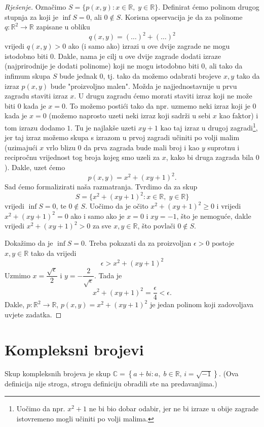 \begin{proof}[Rješenje]
Označimo $S=\{p(x, y) : x\in \mathbb{R},\; y\in \mathbb{R}\}$. Definirat ćemo polinom drugog stupnja za koji je $\inf{S}=0$, ali $0\notin S$. Korisna opservacija je da za polinome $q : \mathbb{R}^2\to \mathbb{R}$ zapisane u obliku
$$q(x, y)=(\dots)^2+(\dots)^2$$
vrijedi $q(x, y)>0$ ako (i samo ako) izrazi u ove dvije zagrade ne mogu istodobno biti $0$. Dakle, nama je cilj u ove dvije zagrade dodati izraze (najprirodnije je dodati polinome) koji ne mogu istodobno biti $0$, ali tako da infimum skupa $S$ bude jednak $0$, tj. tako da možemo odabrati brojeve $x, y$ tako da izraz $p(x, y)$ bude "proizvoljno malen". Možda je najjednostavnije u prvu zagradu staviti izraz $x$. U drugu zagradu ćemo morati staviti izraz koji ne može biti $0$ kada je $x=0$. To možemo postići tako da npr. uzmemo neki izraz koji je $0$ kada je $x=0$ (možemo naprosto uzeti neki izraz koji sadrži u sebi $x$ kao faktor) i tom izrazu dodamo $1$. Tu je najlakše uzeti $xy+1$ kao taj izraz u drugoj zagradi\footnote{Uočimo da npr. $x^2+1$ ne bi bio dobar odabir, jer ne bi izraze u obije zagrade istovremeno mogli učiniti po volji malima.}, jer taj izraz možemo skupa s izrazom u prvoj zagradi učiniti po volji malim (uzimajući $x$ vrlo blizu $0$ da prva zagrada bude mali broj i kao $y$ suprotnu i recipročnu vrijednost tog broja kojeg smo uzeli za $x$, kako bi druga zagrada bila $0$). Dakle, uzet ćemo
$$p(x, y)=x^2+(xy+1)^2.$$
Sad ćemo formalizirati naša razmatranja. Tvrdimo da za skup
$$S=\{x^2+(xy+1)^2 : x\in \mathbb{R},\; y\in \mathbb{R}\}$$
vrijedi $\inf{S}=0$, te $0\notin S$. Uočimo da je očito $x^2+(xy+1)^2\geq 0$ i vrijedi $x^2+(xy+1)^2=0$ ako i samo ako je $x=0$ i $xy=-1$, što je nemoguće, dakle vrijedi $x^2+(xy+1)^2>0$ za sve $x, y\in \mathbb{R}$, što povlači $0\notin S$.

Dokažimo da je $\inf{S}=0$. Treba pokazati da za proizvoljan $\epsilon>0$ postoje $x, y\in \mathbb{R}$ tako da vrijedi
$$\epsilon> x^2+(xy+1)^2$$
Uzmimo $x=\dfrac{\sqrt{\epsilon}}{2}$ i $y=-\dfrac{2}{\sqrt{\epsilon}}$. Tada je
$$x^2+(xy+1)^2=\dfrac{\epsilon}{4}<\epsilon.$$
Dakle, $p : \mathbb{R}^2\to \mathbb{R}$, $p(x, y)=x^2+(xy+1)^2$ je jedan polinom koji zadovoljava uvjete zadatka.
\end{proof}
\section{Kompleksni brojevi}

\begin{definition}
Skup kompleksnih brojeva je skup $\mathbb{C}=\left\{a+bi : a,\; b\in \mathbb{R},\, i=\sqrt{-1}\right\}$.
(Ova definicija nije stroga, strogu definiciju obradili ste na predavanjima.)
\end{definition}

